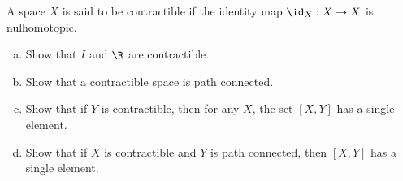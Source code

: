 \documentclass[11pt,letterpaper]{article}
\begin{document}
\begin{problem}
    A space $X$ is said to be contractible if the identity map $\id_X : X \to X$ is nulhomotopic.
    \begin{enumerate}[(a)]
        \item Show that $I$ and $\R$ are contractible.
        \item Show that a contractible space is path connected.
        \item Show that if $Y$ is contractible, then for any $X$, the set $[X,Y]$ has a single element.
        \item Show that if $X$ is contractible and $Y$ is path connected, then $[X,Y]$ has a single element.
    \end{enumerate}
\end{problem}
\end{document}
